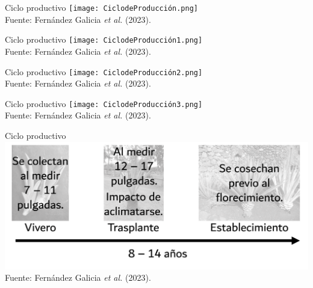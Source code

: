 \documentclass[aspectratio=169]{beamer}
\begin{document}
\begin{frame}{Ciclo productivo}
	\texttt{[image: CiclodeProducción.png]}\\
	{\scriptsize Fuente: Fernández Galicia \textit{et al.} (2023).}
\end{frame}

\begin{frame}{Ciclo productivo}
	\texttt{[image: CiclodeProducción1.png]}\\
	{\scriptsize Fuente: Fernández Galicia \textit{et al.} (2023).}
\end{frame}

\begin{frame}{Ciclo productivo}
	\texttt{[image: CiclodeProducción2.png]}\\
	{\scriptsize Fuente: Fernández Galicia \textit{et al.} (2023).}
\end{frame}

\begin{frame}{Ciclo productivo}
	\texttt{[image: CiclodeProducción3.png]}\\
	{\scriptsize Fuente: Fernández Galicia \textit{et al.} (2023).}
\end{frame}

\begin{frame}{Ciclo productivo}
	\includegraphics[width=\textwidth]{CiclodeProducción4.png}\\
	{\scriptsize Fuente: Fernández Galicia \textit{et al.} (2023).}
\end{frame}
\end{document}
